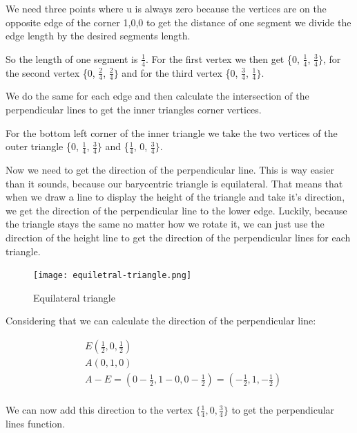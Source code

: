 \documentclass[12pt]{report} \usepackage{preamble}
\begin{document}
We need three points where u is always zero because the vertices are on the opposite edge of the corner {1,0,0}
to get the distance of one segment we divide the edge length by the desired segments length.

So the length of one segment is \(\frac{1}{4}\).
For the first vertex we then get \{0, \(\frac{1}{4}\), \(\frac{3}{4}\}\), for the second
vertex \{0, \(\frac{2}{4}\), \(\frac{2}{4}\}\) and for the third vertex \{0, \(\frac{3}{4}\), \(\frac{1}{4}\}\).

We do the same for each edge and then calculate the intersection of the
perpendicular lines to get the inner triangles corner vertices.

For the bottom left corner of the inner triangle we take the
two vertices of the outer triangle \{0, \(\frac{1}{4}\), \(\frac{3}{4}\}\)
and \{\(\frac{1}{4}\), 0, \(\frac{3}{4}\}\).

Now we need to get the direction of the perpendicular line.
This is way easier than it sounds, because our barycentric triangle is equilateral.
That means that when we draw a line to display the height of the triangle and take it's direction,
we get the direction of the perpendicular line to the lower edge.
Luckily, because the triangle stays the same no matter how we rotate it, we can just use
the direction of the height line to get the direction of the
perpendicular lines for each triangle. \cite{equilateral-triangle}

\begin{figure}[htbp]
	\centering \texttt{[image: equiletral-triangle.png]}
	\caption{Equilateral triangle}
	\cite{equilateral-triangle}
\end{figure} \Floatbarrier

Considering that we can calculate the direction of the perpendicular line:

\[
	\begin{aligned}
		 & E(\frac{1}{2}, 0, \frac{1}{2})                                                      \\
		 & A(0, 1, 0)                                                                          \\
		 & A - E = (0 - \frac{1}{2}, 1 - 0, 0 - \frac{1}{2}) = (-\frac{1}{2}, 1, -\frac{1}{2}) \\
	\end{aligned}
\]

We can now add this direction to the vertex \(\{\frac{1}{4}, 0, \frac{3}{4}\}\)
to get the perpendicular lines function.
\end{document}
